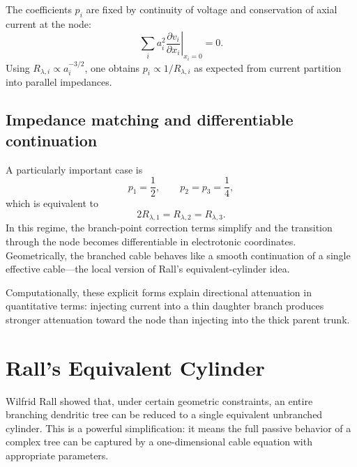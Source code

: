 The coefficients $p_i$ are fixed by continuity of voltage and conservation of axial current at the node:
%
\begin{equation}
  \sum_i a_i^2 \left.\frac{\partial v_i}{\partial x_i}\right|_{x_i=0}=0.
  \label{eq:branch-current-bc}
\end{equation}
%
Using $R_{\lambda,i} \propto a_i^{-3/2}$, one obtains $p_i \propto 1/R_{\lambda,i}$ as expected from current partition into parallel impedances.

\subsection{Impedance matching and differentiable continuation}

A particularly important case is
%
\begin{equation}
  p_1=\frac{1}{2}, \qquad p_2=p_3=\frac{1}{4},
  \label{eq:branch-special-p}
\end{equation}
%
which is equivalent to
%
\begin{equation}
  2R_{\lambda,1}=R_{\lambda,2}=R_{\lambda,3}.
  \label{eq:branch-impedance-match}
\end{equation}
%
In this regime, the branch-point correction terms simplify and the transition through the node becomes differentiable in electrotonic coordinates. Geometrically, the branched cable behaves like a smooth continuation of a single effective cable---the local version of Rall's equivalent-cylinder idea.

Computationally, these explicit forms explain directional attenuation in quantitative terms: injecting current into a thin daughter branch produces stronger attenuation toward the node than injecting into the thick parent trunk.

\section{Rall's Equivalent Cylinder}
\label{sec:rall}

Wilfrid Rall showed that, under certain geometric constraints, an entire branching dendritic tree can be reduced to a single equivalent unbranched cylinder. This is a powerful simplification: it means the full passive behavior of a complex tree can be captured by a one-dimensional cable equation with appropriate parameters.

